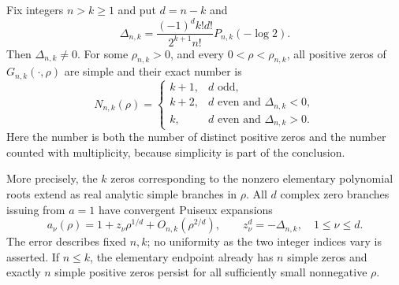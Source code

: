 \begin{theorem}
\label{lerchboundary:thm:smallrho}
Fix integers $n>k\geq1$ and put $d=n-k$ and
\begin{equation}\label{lerchboundary:eq:Delta}
 \Delta_{n,k}=
 \frac{(-1)^d k!d!}{2^{k+1}n!}P_{n,k}(-\log2).
\end{equation}
Then $\Delta_{n,k}\neq0$.  For some $\rho_{n,k}>0$, and every
$0<\rho<\rho_{n,k}$, all positive zeros of
$G_{n,k}(\cdot,\rho)$ are simple and their exact number is
\begin{equation}\label{lerchboundary:eq:count}
 N_{n,k}(\rho)=
 \begin{cases}
 k+1,&d\text{ odd},\\
 k+2,&d\text{ even and }\Delta_{n,k}<0,\\
 k,&d\text{ even and }\Delta_{n,k}>0.
 \end{cases}
\end{equation}
Here the number is both the number of distinct positive zeros and the
number counted with multiplicity, because simplicity is part of the
conclusion.

More precisely, the $k$ zeros corresponding to the nonzero elementary
polynomial roots extend as real analytic simple branches in $\rho$.
All $d$ complex zero branches issuing from $a=1$ have convergent Puiseux
expansions
\begin{equation}\label{lerchboundary:eq:puiseux}
 a_\nu(\rho)=1+z_\nu\rho^{1/d}+O_{n,k}(\rho^{2/d}),
 \qquad z_\nu^d=-\Delta_{n,k},\quad 1\leq\nu\leq d.
\end{equation}
The error describes fixed $n,k$; no uniformity as the two integer indices
vary is asserted.  If $n\leq k$, the elementary endpoint already has
$n$ simple zeros and exactly $n$ simple positive zeros persist for all
sufficiently small nonnegative $\rho$.
\end{theorem}

